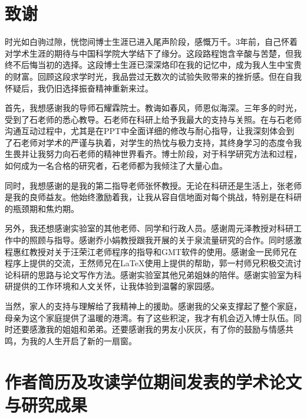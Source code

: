 \chapter[致谢]{致\quad 谢}

时光如白驹过隙，恍惚间博士生涯已进入尾声阶段，感慨万千。3年前，自己怀着对学术生涯的期待与中国科学院大学结下了缘分。这段路程饱含辛酸与苦楚，但我终不后悔当初的选择。这段博士生涯已深深烙印在我的记忆中，成为我人生中宝贵的财富。回顾这段求学时光，我品尝过无数次的试验失败带来的挫折感。但在自我怀疑后，我仍旧选择振奋精神重新来过。

首先，我想感谢我的导师石耀霖院士。教诲如春风，师恩似海深。三年多的时光，受到了石老师的悉心教导。石老师在科研上给予我最大的支持与关照。在与石老师沟通互动过程中，尤其是在PPT中全面详细的修改与耐心指导，让我深刻体会到了石老师对学术的严谨与执着，对学生的热忱与极力支持，其终身学习的态度令我生畏并让我努力向石老师的精神世界看齐。博士阶段，对于科学研究方法和过程，如何成为一名合格的研究者，石老师都为我倾注了大量心血。

同时，我想感谢的是我的第二指导老师张怀教授。无论在科研还是生活上，张老师是我的良师益友。他始终激励着我，让我从容自信地面对每个挑战，特别是在科研的瓶颈期和焦灼期。

另外，我还想感谢实验室的其他老师、同学和行政人员。感谢周元泽教授对科研工作中的照顾与指导。感谢乔小娟教授跟我开展的关于泉流量研究的合作。同时感激程惠红教授对关于汪荣江老师程序的指导和GMT软件的使用。感谢金一民师兄在程序上提供的交流，王然师兄在\LaTeX{}使用上提供的帮助，郭一村师兄积极交流讨论科研的思路与论文写作方法。感谢实验室其他兄弟姐妹的陪伴。感谢实验室为科研提供的工作环境和人文关怀，让我体验到温馨的家园感。

当然，家人的支持与理解给了我精神上的援助。感谢我的父亲支撑起了整个家庭，母亲为这个家庭提供了温暖的港湾。有了这些积淀，我才有机会迈入博士队伍。同时还要感激我的姐姐和弟弟。还要感谢我的男友小灰灰，有了你的鼓励与情感共鸣，为我的人生开启了新的一扇窗。


\chapter{作者简历及攻读学位期间发表的学术论文与研究成果}

